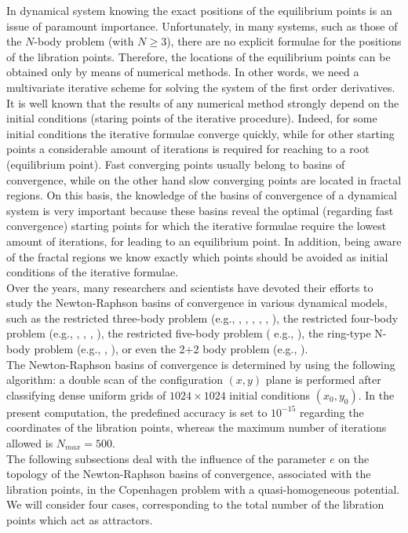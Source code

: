 \documentclass[preprint,fleqn,5p,numbers,sort&compress]{elsarticle}
\begin{document}
In dynamical system knowing the exact positions of the equilibrium points is an issue of paramount importance. Unfortunately, in many systems, such as those of the $N$-body problem (with $N \geq 3$), there are no explicit formulae for the positions of the libration points. Therefore, the locations of the equilibrium points can be obtained only by means of numerical methods. In other words, we need a multivariate iterative scheme for solving the system of the first order derivatives. It is well known that the results of any numerical method strongly depend on the initial conditions (staring points of the iterative procedure). Indeed, for some initial conditions the iterative formulae converge quickly, while for other starting points a considerable amount of iterations is required for reaching to a root (equilibrium point). Fast converging points usually belong to basins of convergence, while on the other hand slow converging points are located in fractal regions. On this basis, the knowledge of the basins of convergence of a dynamical system is very important because these basins reveal the optimal (regarding fast convergence) starting points for which the iterative formulae require the lowest amount of iterations, for leading to an equilibrium point. In addition, being aware of the fractal regions we know exactly which points should be avoided as initial conditions of the iterative formulae.\\

Over the years, many researchers and scientists have devoted their efforts to study the Newton-Raphson basins of convergence in various dynamical models, such as the restricted three-body problem (e.g., \cite{CK04b}, \cite{dou12}, \cite{zot16}, \cite{zot17a}, \cite{zot17c}, \cite{sur18a}), the restricted four-body problem (e.g.,  \cite{zot17b}, \cite{sur17a}, \cite{sur17b}, \cite{sur18b}), the restricted five-body problem ( e.g., \cite{ZS18}), the ring-type N-body problem (e.g., \cite{CK04a}, \cite{CK07}), or even the 2+2 body problem (e.g., \cite{CK13}).\\
The Newton-Raphson basins of convergence is determined by using the following algorithm: a double scan of the configuration $(x,y)$ plane is performed after classifying dense uniform grids of $1024\times1024$ initial conditions $(x_0, y_0)$. In the present computation, the predefined accuracy is set to $10^{-15}$ regarding the coordinates of the libration points, whereas the maximum number of iterations allowed is $N_{max}=500$.\\
The following subsections deal with the influence of the parameter $e$ on the topology of the Newton-Raphson basins of convergence, associated with the libration points, in the Copenhagen problem with a quasi-homogeneous potential. We will consider four cases, corresponding to the total number of the libration points which act as attractors.
\end{document}
